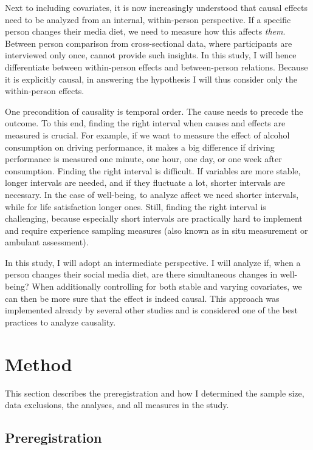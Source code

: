 \documentclass[
  english,
  man,mask,floatsintext]{apa6}
\begin{document}
Next to including covariates, it is now increasingly understood that causal effects need to be analyzed from an internal, within-person perspective.
If a specific person changes their media diet, we need to measure how this affects \emph{them}.
Between person comparison from cross-sectional data, where participants are interviewed only once, cannot provide such insights.
In this study, I will hence differentiate between within-person effects and between-person relations.
Because it is explicitly causal, in answering the hypothesis I will thus consider only the within-person effects.

One precondition of causality is temporal order.
The cause needs to precede the outcome.
To this end, finding the right interval when causes and effects are measured is crucial.
For example, if we want to measure the effect of alcohol consumption on driving performance, it makes a big difference if driving performance is measured one minute, one hour, one day, or one week after consumption.
Finding the right interval is difficult.
If variables are more stable, longer intervals are needed, and if they fluctuate a lot, shorter intervals are necessary.
In the case of well-being, to analyze affect we need shorter intervals, while for life satisfaction longer ones.
Still, finding the right interval is challenging, because especially short intervals are practically hard to implement and require experience sampling measures (also known as in situ measurement or ambulant assessment).

In this study, I will adopt an intermediate perspective.
I will analyze if, when a person changes their social media diet, are there simultaneous changes in well-being?
When additionally controlling for both stable and varying covariates, we can then be more sure that the effect is indeed causal.
This approach was implemented already by several other studies and is considered one of the best practices to analyze causality.

\hypertarget{method}{%
\section{Method}\label{method}}

This section describes the preregistration and how I determined the sample size, data exclusions, the analyses, and all measures in the study.

\hypertarget{preregistration}{%
\subsection{Preregistration}\label{preregistration}}
\end{document}

